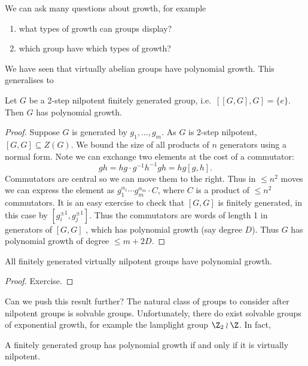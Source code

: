 \documentclass[a4paper]{article}
\begin{document}
We can ask many questions about growth, for example
\begin{enumerate}
\item what types of growth can groups display?
\item which group have which types of growth?
\end{enumerate}

We have seen that virtually abelian groups have polynomial growth. This generalises to

\begin{proposition}
  Let \(G\) be a 2-step nilpotent finitely generated group, i.e.\ \([[G, G], G] = \{e\}\). Then \(G\) has polynomial growth.
\end{proposition}

\begin{proof}
  Suppose \(G\) is generated by \(g_1, \dots, g_m\). As \(G\) is 2-step nilpotent, \([G, G] \subseteq Z(G)\). We bound the size of all products of \(n\) generators using a normal form. Note we can exchange two elements at the cost of a commutator:
  \[
    gh = hg \cdot g^{-1}h^{-1}gh = hg [g, h].
  \]
  Commutators are central so we can move them to the right. Thus in \(\leq n^2\) moves we can express the element as \(g_1^{\alpha_1} \cdots g_m^{\alpha_m} \cdot C\), where \(C\) is a product of \(\leq n^2\) commutators. It is an easy exercise to check that \([G, G]\) is finitely generated, in this case by \([g_i^{\pm 1}, g_j^{\pm 1}]\). Thus the commutators are words of length 1 in generators of \([G, G]\) , which has polynomial growth (say degree \(D\)). Thus \(G\) has polynomial growth of degree \(\leq m + 2D\).
\end{proof}

\begin{theorem}
  All finitely generated virtually nilpotent groups have polynomial growth.
\end{theorem}

\begin{proof}
  Exercise.
\end{proof}

Can we push this result further? The natural class of groups to consider after nilpotent groups is solvable groups. Unfortunately, there do exist solvable groups of exponential growth, for example the lamplight group \(\Z_2 \wr \Z\). In fact,

\begin{theorem}[Gromov]
  A finitely generated group has polynomial growth if and only if it is virtually nilpotent.
\end{theorem}
\end{document}
